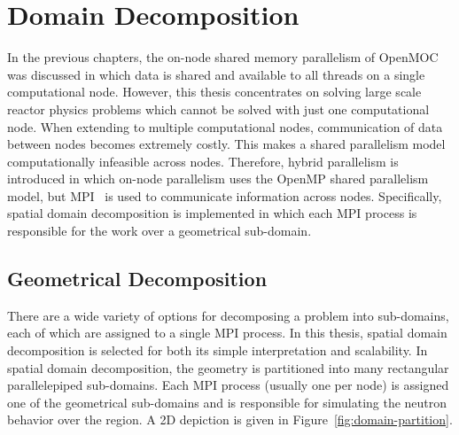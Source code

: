 \chapter{Domain Decomposition}
\label{chap:domain-decomposition}

In the previous chapters, the on-node shared memory parallelism of OpenMOC was discussed in which data is shared and available to all threads on a single computational node. However, this thesis concentrates on solving large scale reactor physics problems which cannot be solved with just one computational node. When extending to multiple computational nodes, communication of data between nodes becomes extremely costly. This makes a shared parallelism model computationally infeasible across nodes. Therefore, hybrid parallelism is introduced in which on-node parallelism uses the OpenMP shared parallelism model, but \ac{MPI}~\cite{mpi} is used to communicate information across nodes. Specifically, spatial domain decomposition is implemented in which each \ac{MPI} process is responsible for the work over a geometrical sub-domain.


\section{Geometrical Decomposition}
\label{sec:geometrical-decomposition}

There are a wide variety of options for decomposing a problem into sub-domains, each of which are assigned to a single \ac{MPI} process. In this thesis, spatial domain decomposition is selected for both its simple interpretation and scalability. In spatial domain decomposition, the geometry is partitioned into many rectangular parallelepiped sub-domains. Each \ac{MPI} process (usually one per node) is assigned one of the geometrical sub-domains and is responsible for simulating the neutron behavior over the region. A 2D depiction is given in Figure~\ref{fig:domain-partition}.


